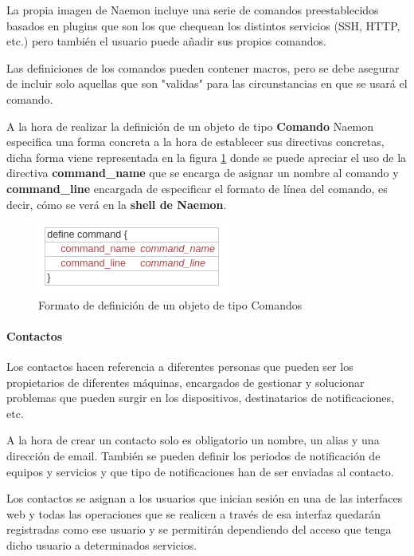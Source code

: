 La propia imagen de Naemon incluye una serie de comandos preestablecidos basados en plugins que son los que chequean los distintos servicios (SSH, HTTP, etc.) pero también el usuario puede añadir sus propios comandos.

Las definiciones  de los comandos pueden contener macros, pero se debe asegurar de incluir solo aquellas que son "validas" para las circunstancias en que se usará el comando.

A la hora de realizar la definición de un objeto de tipo \textbf{Comando} Naemon especifica una forma concreta a la hora de establecer sus directivas concretas, dicha forma viene representada en la figura \ref{define-command} donde se puede apreciar el uso de la directiva \textbf{command\_name} que se encarga de asignar un nombre al comando y \textbf{command\_line} encargada de especificar el formato de línea del comando, es decir, cómo se verá en la \textbf{shell de Naemon}. 

\begin{figure}[H]
	\centering
	\includegraphics[scale=0.5]{imagenes/definicion_objetos/command.png}
	\caption{Formato de definición de un objeto de tipo Comandos} \label{define-command}	
\end{figure}
\newpage
\paragraph{Contactos}

Los contactos hacen referencia a diferentes personas que pueden ser los propietarios de diferentes máquinas, encargados de gestionar y solucionar problemas que pueden surgir en los dispositivos, destinatarios de notificaciones, etc.

A la hora de crear un contacto solo es obligatorio un nombre, un alias y una dirección de email. También se pueden definir los periodos de notificación de equipos y servicios y que tipo de notificaciones han de ser enviadas al contacto.

Los contactos se asignan a los usuarios que inician sesión en una de las interfaces web y todas las operaciones que se realicen a través de esa interfaz quedarán registradas como ese usuario y se permitirán dependiendo del acceso que tenga dicho usuario a determinados servicios. 


